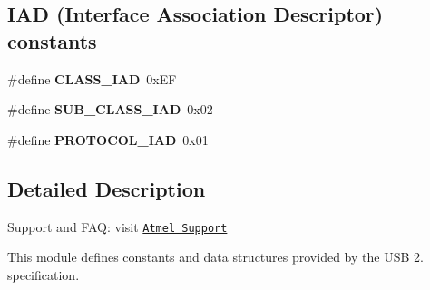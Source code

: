 \subsection*{I\-A\-D (Interface Association Descriptor) constants}
\begin{DoxyCompactItemize}
\item 
\hypertarget{group__usb__protocol__group_gae8971589b19dfa71052d651617324566}{\#define {\bfseries C\-L\-A\-S\-S\-\_\-\-I\-A\-D}~0x\-E\-F}\label{group__usb__protocol__group_gae8971589b19dfa71052d651617324566}

\item 
\hypertarget{group__usb__protocol__group_gaa4e56ac456064b641e2a3a58ea5a4ed3}{\#define {\bfseries S\-U\-B\-\_\-\-C\-L\-A\-S\-S\-\_\-\-I\-A\-D}~0x02}\label{group__usb__protocol__group_gaa4e56ac456064b641e2a3a58ea5a4ed3}

\item 
\hypertarget{group__usb__protocol__group_ga8e85bf6a9a6702c71c68dbc5c4164b9f}{\#define {\bfseries P\-R\-O\-T\-O\-C\-O\-L\-\_\-\-I\-A\-D}~0x01}\label{group__usb__protocol__group_ga8e85bf6a9a6702c71c68dbc5c4164b9f}

\end{DoxyCompactItemize}


\subsection{Detailed Description}
Support and F\-A\-Q\-: visit \href{http://www.atmel.com/design-support/}{\tt Atmel Support}

This module defines constants and data structures provided by the U\-S\-B 2. specification. 

